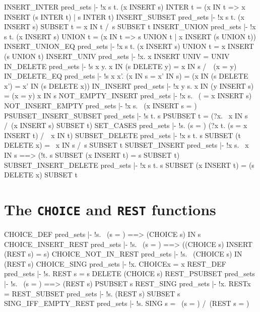 \ENDTHEOREM
\THEOREM INSERT\_INTER pred\_sets
|- !x s t.
    (x INSERT s) INTER t = (x IN t => x INSERT (s INTER t) | s INTER t)
\ENDTHEOREM
\THEOREM INSERT\_SUBSET pred\_sets
|- !x s t. (x INSERT s) SUBSET t = x IN t /\ s SUBSET t
\ENDTHEOREM
\THEOREM INSERT\_UNION pred\_sets
|- !x s t.
    (x INSERT s) UNION t = (x IN t => s UNION t | x INSERT (s UNION t))
\ENDTHEOREM
\THEOREM INSERT\_UNION\_EQ pred\_sets
|- !x s t. (x INSERT s) UNION t = x INSERT (s UNION t)
\ENDTHEOREM
\THEOREM INSERT\_UNIV pred\_sets
|- !x. x INSERT UNIV = UNIV
\ENDTHEOREM
\THEOREM IN\_DELETE pred\_sets
|- !s x y. x IN (s DELETE y) = x IN s /\ ~(x = y)
\ENDTHEOREM
\THEOREM IN\_DELETE\_EQ pred\_sets
|- !s x x'.
    (x IN s = x' IN s) = (x IN (s DELETE x') = x' IN (s DELETE x))
\ENDTHEOREM
\THEOREM IN\_INSERT pred\_sets
|- !x y s. x IN (y INSERT s) = (x = y) \/ x IN s
\ENDTHEOREM
\THEOREM NOT\_EMPTY\_INSERT pred\_sets
|- !x s. ~({} = x INSERT s)
\ENDTHEOREM
\THEOREM NOT\_INSERT\_EMPTY pred\_sets
|- !x s. ~(x INSERT s = {})
\ENDTHEOREM
\THEOREM PSUBSET\_INSERT\_SUBSET pred\_sets
|- !s t. s PSUBSET t = (?x. ~x IN s /\ (x INSERT s) SUBSET t)
\ENDTHEOREM
\THEOREM SET\_CASES pred\_sets
|- !s. (s = {}) \/ (?x t. (s = x INSERT t) /\ ~x IN t)
\ENDTHEOREM
\THEOREM SUBSET\_DELETE pred\_sets
|- !x s t. s SUBSET (t DELETE x) = ~x IN s /\ s SUBSET t
\ENDTHEOREM
\THEOREM SUBSET\_INSERT pred\_sets
|- !x s. ~x IN s ==> (!t. s SUBSET (x INSERT t) = s SUBSET t)
\ENDTHEOREM
\THEOREM SUBSET\_INSERT\_DELETE pred\_sets
|- !x s t. s SUBSET (x INSERT t) = (s DELETE x) SUBSET t
\ENDTHEOREM
\section{The {\tt CHOICE} and {\tt REST} functions}
\THEOREM CHOICE\_DEF pred\_sets
|- !s. ~(s = {}) ==> (CHOICE s) IN s
\ENDTHEOREM
\THEOREM CHOICE\_INSERT\_REST pred\_sets
|- !s. ~(s = {}) ==> ((CHOICE s) INSERT (REST s) = s)
\ENDTHEOREM
\THEOREM CHOICE\_NOT\_IN\_REST pred\_sets
|- !s. ~(CHOICE s) IN (REST s)
\ENDTHEOREM
\THEOREM CHOICE\_SING pred\_sets
|- !x. CHOICE{x} = x
\ENDTHEOREM
\THEOREM REST\_DEF pred\_sets
|- !s. REST s = s DELETE (CHOICE s)
\ENDTHEOREM
\THEOREM REST\_PSUBSET pred\_sets
|- !s. ~(s = {}) ==> (REST s) PSUBSET s
\ENDTHEOREM
\THEOREM REST\_SING pred\_sets
|- !x. REST{x} = {}
\ENDTHEOREM
\THEOREM REST\_SUBSET pred\_sets
|- !s. (REST s) SUBSET s
\ENDTHEOREM
\THEOREM SING\_IFF\_EMPTY\_REST pred\_sets
|- !s. SING s = ~(s = {}) /\ (REST s = {})
\ENDTHEOREM

